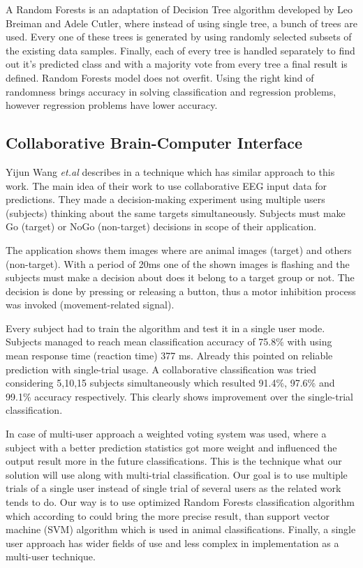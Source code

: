 \documentclass[12pt]{article}
\begin{document}
A Random Forests is an adaptation of Decision Tree algorithm developed by Leo Breiman and Adele Cutler, where instead of using single tree, a bunch of trees are used. Every one of these trees is generated by using randomly selected subsets of the existing data samples. Finally, each of every tree is handled separately to find out it's predicted class and with a majority vote from every tree a final result is defined. Random Forests model does not overfit. Using the right kind of randomness brings accuracy in solving classification and regression problems, however regression problems have lower accuracy.\cite{breiman_rf}

\subsection{Collaborative Brain-Computer Interface}

Yijun Wang {\it et.al} describes in \cite{collaborative_wang} a technique which has similar approach to this work. The main idea of their work to use collaborative EEG input data for predictions. They made a decision-making experiment using multiple users (subjects) thinking about the same targets simultaneously. Subjects must make Go (target) or NoGo (non-target) decisions in scope of their application. 

The application shows them images where are animal images (target) and others (non-target). With a period of 20ms one of the shown images is flashing and the subjects must make a decision about does it belong to a target group or not. The decision is done by pressing or releasing a button, thus a motor inhibition process was invoked (movement-related signal). 

Every subject had to train the algorithm and test it in a single user mode. Subjects managed to reach mean classification accuracy of 75.8\% with using mean response time (reaction time) 377 ms. Already this pointed on reliable prediction with single-trial usage. A collaborative classification was tried considering 5,10,15 subjects simultaneously which resulted 91.4\%, 97.6\% and 99.1\% accuracy respectively. This clearly shows improvement over the single-trial classification. 

In case of multi-user approach a weighted voting system was used, where a subject with a better prediction statistics got more weight and influenced the output result more in the future classifications. This is the technique what our solution will use along with multi-trial classification. Our goal is to use multiple trials of a single user instead of single trial of several users as the related work tends to do. Our way is to use optimized Random Forests classification algorithm which according to \cite{masso} could bring the more precise result, than support vector machine (SVM) algorithm which is used in animal classifications. Finally, a single user approach has wider fields of use and less complex in implementation as a multi-user technique.
\end{document}

